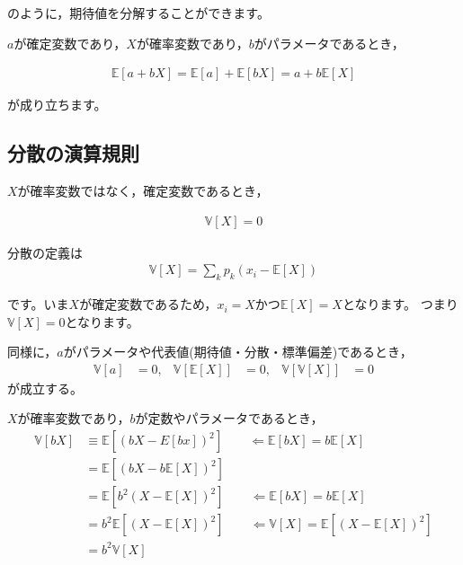 \documentclass[
  letterpaper,
  pandoc,
  ja=standard,
  jafont = hiragino-pron]{ltjsbook}
\begin{document}
のように，期待値を分解することができます。

\(a\)が確定変数であり，\(X\)が確率変数であり，\(b\)がパラメータであるとき，

\[
\begin{aligned}
\mathbb{E} [a + bX] = \mathbb{E} [a] + \mathbb{E} [bX] = a + b \mathbb{E}[X]
\end{aligned}
\]

が成り立ちます。

\subsection{分散の演算規則}\label{ux5206ux6563ux306eux6f14ux7b97ux898fux5247}

\(X\)が確率変数ではなく，確定変数であるとき，

\[
\begin{aligned}
\mathbb{V}[X] = 0
\end{aligned}
\]

\begin{tcolorbox}[enhanced jigsaw, colframe=quarto-callout-warning-color-frame, breakable, rightrule=.15mm, coltitle=black, title=\textcolor{quarto-callout-warning-color}{\faExclamationTriangle}\hspace{0.5em}{証明}, colbacktitle=quarto-callout-warning-color!10!white, leftrule=.75mm, colback=white, left=2mm, arc=.35mm, opacityback=0, titlerule=0mm, toptitle=1mm, bottomtitle=1mm, bottomrule=.15mm, toprule=.15mm, opacitybacktitle=0.6]

分散の定義は \[
\begin{aligned}
\mathbb{V}[X] = \sum _k p_k (x_i - \mathbb{E}[X])
\end{aligned}
\]

です。いま\(X\)が確定変数であるため，\(x_i = X\)かつ\(\mathbb{E}[X] = X\)となります。
つまり\(\mathbb{V}[X] = 0\)となります。

\end{tcolorbox}

同様に，\(a\)がパラメータや代表値(期待値・分散・標準偏差)であるとき， \[
\begin{aligned}
\mathbb{V} [a] &= 0 , & \mathbb{V} [\mathbb{E}[X]] &= 0,&  \mathbb{V}[\mathbb{V}[X]] &= 0
\end{aligned}
\] が成立する。

\(X\)が確率変数であり，\(b\)が定数やパラメータであるとき， \[
\begin{aligned}
\mathbb{V}[bX] &\equiv \mathbb{E} \left [(bX -E[bx])^2 \right ] \qquad \Leftarrow \mathbb{E}[bX] = b\mathbb{E}[X] \nonumber \\
         &= \mathbb{E} \left[(bX - b \mathbb{E}[X])^2\right ]\nonumber \\
         &= \mathbb{E} \left[b^2 (X-\mathbb{E}[X])^2\right ] \qquad \Leftarrow \mathbb{E}[bX] = b\mathbb{E}[X]\nonumber \\
         &= b^2 \mathbb{E} \left[(X-\mathbb{E}[X])^2\right ] \qquad \Leftarrow \mathbb{V} [X] = \mathbb{E} \left [(X-\mathbb{E}[X])^2 \right ]\nonumber \\
         &= b^2 \mathbb{V} [X]
\end{aligned}
\]
\end{document}
